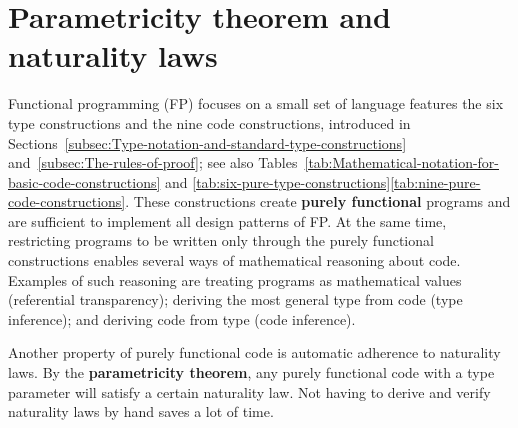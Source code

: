 \begin{comment}
your compiler does not have some critical bugs that allow it to oversee
that you have not followed the derivation rules of the logic that
is an extremely valuable feature of functional programming languages
that are based on the Curie habit correspondence you can prove their
safety at compile time or at least exclude a large number of possible
bugs and errors certainly these languages are quite large and they
include features that are not covered by the Carey Hart correspondence
type constructors that I have not considered in this tutorial and
those might may not be safe but at least the foundation of these languages
the foundation of the type system will be safe so that is the final
lesson from the great Howard correspondence this concludes the tutorial 
\end{comment}


\chapter{Parametricity theorem and naturality laws\label{chap:Proofs-of-naturality-parametricity}}

Functional programming (FP) focuses on a small set of language features
\textemdash{} the six type constructions and the nine code constructions,
introduced in Sections~\ref{subsec:Type-notation-and-standard-type-constructions}
and~\ref{subsec:The-rules-of-proof}; see also Tables~\ref{tab:Mathematical-notation-for-basic-code-constructions}
and \ref{tab:six-pure-type-constructions}\textendash \ref{tab:nine-pure-code-constructions}.
These constructions create \textbf{purely functional} programs
and are sufficient to implement all design patterns of FP. At the
same time, restricting programs to be written only through the purely
functional constructions enables several ways of mathematical reasoning
about code. Examples of such reasoning are treating programs as mathematical
values (referential transparency); deriving the most general type
from code (type inference); and deriving code from type (code inference).

Another property of purely functional code is automatic adherence
to naturality laws. By the \textbf{parametricity theorem},
any purely functional code with a type parameter will satisfy a certain
naturality law. Not having to derive and verify naturality laws by
hand saves a lot of time.

